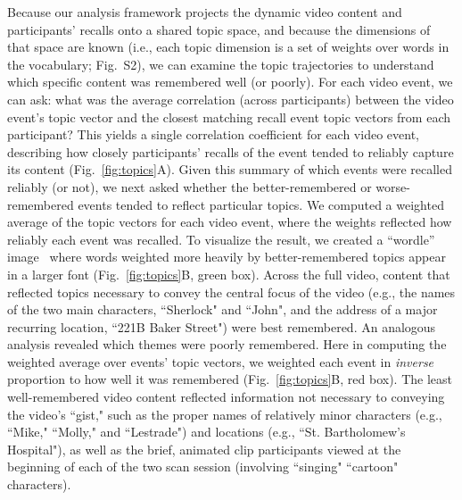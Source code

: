 \documentclass{article}
\newcommand{\topics}{S2}
\begin{document}
Because our analysis framework projects the dynamic video content and participants' recalls onto a shared topic space, and because the dimensions of that space are known (i.e., each topic dimension is a set of weights over words in the vocabulary; Fig.~\topics), we can examine the topic trajectories to understand which specific content was remembered well (or poorly).  For each video event, we can ask: what was the average correlation (across participants) between the video event's topic vector and the closest matching recall event topic vectors from each participant? This yields a single correlation coefficient for each video event, describing how closely participants' recalls of the event tended to reliably capture its content (Fig.~\ref{fig:topics}A).  Given this summary of which events were recalled reliably (or not), we next asked whether the better-remembered or worse-remembered events tended to reflect particular topics.  We computed a weighted average of the topic vectors for each video event, where the weights reflected how reliably each event was recalled.  To visualize the result, we created a ``wordle'' image~\citep{MuelEtal18} where words weighted more heavily by better-remembered topics appear in a larger font (Fig.~\ref{fig:topics}B, green box).  Across the full video, content that reflected topics necessary to convey the central focus of the video (e.g., the names of the two main characters, ``Sherlock" and ``John", and the address of a major recurring location, ``221B Baker Street") were best remembered.  An analogous analysis revealed which themes were poorly remembered.  Here in computing the weighted average over events' topic vectors, we weighted each event in \textit{inverse} proportion to how well it was remembered (Fig.~\ref{fig:topics}B, red box).  The least well-remembered video content reflected information not necessary to conveying the video's ``gist," such as the proper names of relatively minor characters (e.g., ``Mike," ``Molly," and ``Lestrade") and locations (e.g., ``St. Bartholomew's Hospital"), as well as the brief, animated clip participants viewed at the beginning of each of the two scan session (involving ``singing" ``cartoon" characters).
\end{document}
